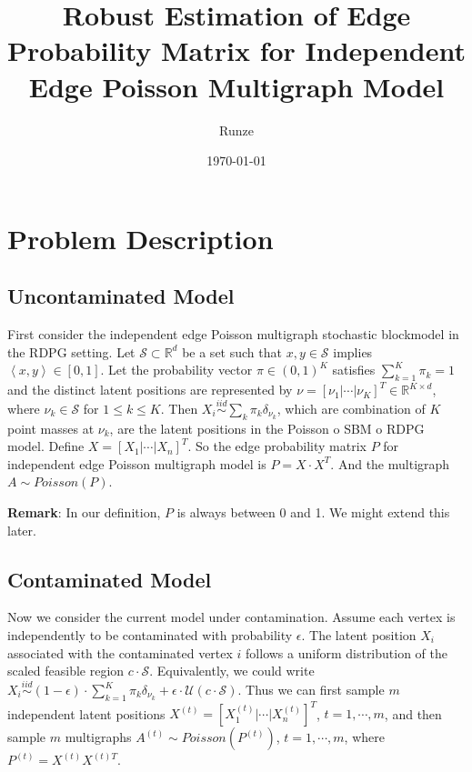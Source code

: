 \documentclass[a4paper]{article}
\title{Robust Estimation of Edge Probability Matrix for Independent Edge Poisson Multigraph Model}
\author{Runze}
\date{\today}
\begin{document}
\maketitle



\section{Problem Description}
\subsection{Uncontaminated Model}
First consider the independent edge Poisson multigraph stochastic blockmodel in the RDPG setting.
Let $\mathcal{S} \subset \mathbb{R}^d$ be a set such that $x, y \in \mathcal{S}$ implies $\left \langle x, y \right \rangle \in [0, 1]$. Let the probability vector $\pi \in (0, 1)^K$ satisfies $\sum_{k=1}^K \pi_k = 1$ and the distinct latent positions are represented by $\nu = [\nu_1 | \cdots | \nu_K]^T \in \mathbb{R}^{K \times d}$, where $\nu_k \in \mathcal{S}$ for $1 \le k \le K$. Then $X_i \stackrel{iid}{\sim} \sum_k \pi_k \delta_{\nu_k}$, which are combination of $K$ point masses at $\nu_k$, are the latent positions in the Poisson o SBM o RDPG model. Define $X = [X_1|\cdots |X_n]^T$. So the edge probability matrix $P$ for independent edge Poisson multigraph model is $P = X \cdot X^T$. And the multigraph $A \sim Poisson(P)$.

\noindent \textbf{Remark}: In our definition, $P$ is always between 0 and 1. We might extend this later.

\subsection{Contaminated Model}
Now we consider the current model under contamination. Assume each vertex is independently to be contaminated with probability $\epsilon$. The latent position $X_i$ associated with the contaminated vertex $i$ follows a uniform distribution of the scaled feasible region $c \cdot \mathcal{S}$. Equivalently, we could write
$X_i \stackrel{iid}{\sim} (1 - \epsilon) \cdot \sum_{k = 1}^K \pi_k \delta_{\nu_k} + \epsilon \cdot \mathcal{U}\left( c \cdot \mathcal{S} \right)$. Thus we can first sample $m$ independent latent positions $X^{(t)} = [X_1^{(t)}|\cdots|X_n^{(t)}]^T$, $t = 1, \cdots, m$, and then sample $m$ multigraphs $A^{(t)} \sim Poisson(P^{(t)})$, $t = 1, \cdots, m$, where $P^{(t)} = X^{(t)} X^{(t)T}$.
\end{document}
